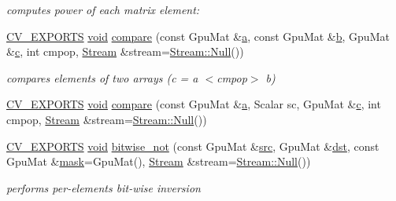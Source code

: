 \begin{DoxyCompactItemize}
\begin{DoxyCompactList}\small\item\em computes power of each matrix element\-: \end{DoxyCompactList}\item 
\hyperlink{core_2types__c_8h_a1bf9f0e121b54272da02379cfccd0a2b}{C\-V\-\_\-\-E\-X\-P\-O\-R\-T\-S} \hyperlink{legacy_8hpp_a8bb47f092d473522721002c86c13b94e}{void} \hyperlink{namespacecv_1_1gpu_a9d383d70bc30ddc96040e68ea69dfd32}{compare} (const Gpu\-Mat \&\hyperlink{legacy_8hpp_a1031d0e0a97a340abfe0a6ab9e831045}{a}, const Gpu\-Mat \&\hyperlink{legacy_8hpp_ac04272e8ca865b8fba18d36edae9fd2a}{b}, Gpu\-Mat \&\hyperlink{legacy_8hpp_a1971420173e06f45845eed2ab4e3d5d0}{c}, int cmpop, \hyperlink{classcv_1_1gpu_1_1Stream}{Stream} \&stream=\hyperlink{classcv_1_1gpu_1_1Stream_af96c23564834f88333dcb8997df553f1}{Stream\-::\-Null}())
\begin{DoxyCompactList}\small\item\em compares elements of two arrays (c = a $<$cmpop$>$ b) \end{DoxyCompactList}\item 
\hyperlink{core_2types__c_8h_a1bf9f0e121b54272da02379cfccd0a2b}{C\-V\-\_\-\-E\-X\-P\-O\-R\-T\-S} \hyperlink{legacy_8hpp_a8bb47f092d473522721002c86c13b94e}{void} \hyperlink{namespacecv_1_1gpu_abd3a61cadcfabe6207cb2f65d6396db0}{compare} (const Gpu\-Mat \&\hyperlink{legacy_8hpp_a1031d0e0a97a340abfe0a6ab9e831045}{a}, Scalar sc, Gpu\-Mat \&\hyperlink{legacy_8hpp_a1971420173e06f45845eed2ab4e3d5d0}{c}, int cmpop, \hyperlink{classcv_1_1gpu_1_1Stream}{Stream} \&stream=\hyperlink{classcv_1_1gpu_1_1Stream_af96c23564834f88333dcb8997df553f1}{Stream\-::\-Null}())
\item 
\hyperlink{core_2types__c_8h_a1bf9f0e121b54272da02379cfccd0a2b}{C\-V\-\_\-\-E\-X\-P\-O\-R\-T\-S} \hyperlink{legacy_8hpp_a8bb47f092d473522721002c86c13b94e}{void} \hyperlink{namespacecv_1_1gpu_ae2bc5b749e6c759666097f514fb003be}{bitwise\-\_\-not} (const Gpu\-Mat \&\hyperlink{legacy_8hpp_a371cd109b74033bc4366f584edd3dacc}{src}, Gpu\-Mat \&\hyperlink{photo__c_8h_aed13e2a25279b24dc954073233fef7a5}{dst}, const Gpu\-Mat \&\hyperlink{tracking_8hpp_a6b13ecd2fd6ec7ad422f1d7863c3ad19}{mask}=Gpu\-Mat(), \hyperlink{classcv_1_1gpu_1_1Stream}{Stream} \&stream=\hyperlink{classcv_1_1gpu_1_1Stream_af96c23564834f88333dcb8997df553f1}{Stream\-::\-Null}())
\begin{DoxyCompactList}\small\item\em performs per-\/elements bit-\/wise inversion \end{DoxyCompactList}\item 

\end{DoxyCompactItemize}
